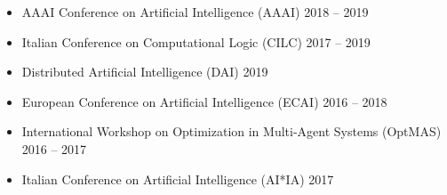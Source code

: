 \begin{itemize}
  \item AAAI Conference on Artificial Intelligence (AAAI) 
  \hfill {2018 -- 2019}

  \item Italian Conference on Computational Logic (CILC) 
  \hfill {2017 -- 2019}

  \item Distributed Artificial Intelligence (DAI) 
  \hfill {2019}

  \item European Conference on Artificial Intelligence (ECAI) 
  \hfill {2016 -- 2018}

  \item International Workshop on Optimization in Multi-Agent Systems (OptMAS) 
  \hfill {2016 -- 2017}

  \item Italian Conference on Artificial Intelligence (AI*IA) 
  \hfill {2017}
\end{itemize}


